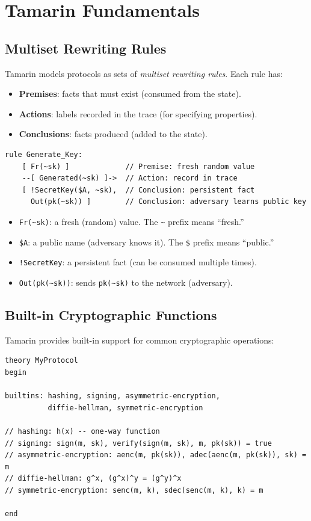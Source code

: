 \section{Tamarin Fundamentals}


\subsection{Multiset Rewriting Rules}

Tamarin models protocols as sets of \emph{multiset rewriting rules}. Each rule has:
\begin{itemize}[nosep]
  \item \textbf{Premises}: facts that must exist (consumed from the state).
  \item \textbf{Actions}: labels recorded in the trace (for specifying properties).
  \item \textbf{Conclusions}: facts produced (added to the state).
\end{itemize}

\begin{lstlisting}[language=Tamarin,caption={A multiset rewriting rule}]
rule Generate_Key:
    [ Fr(~sk) ]             // Premise: fresh random value
    --[ Generated(~sk) ]->  // Action: record in trace
    [ !SecretKey($A, ~sk),  // Conclusion: persistent fact
      Out(pk(~sk)) ]        // Conclusion: adversary learns public key
\end{lstlisting}

\begin{itemize}[nosep]
  \item \texttt{Fr(\~{}sk)}: a fresh (random) value. The \texttt{\~{}} prefix means ``fresh.''
  \item \texttt{\$A}: a public name (adversary knows it). The \texttt{\$} prefix means ``public.''
  \item \texttt{!SecretKey}: a persistent fact (can be consumed multiple times).
  \item \texttt{Out(pk(\~{}sk))}: sends \texttt{pk(\~{}sk)} to the network (adversary).
\end{itemize}

\subsection{Built-in Cryptographic Functions}

Tamarin provides built-in support for common cryptographic operations:

\begin{lstlisting}[language=Tamarin,caption={Tamarin builtins}]
theory MyProtocol
begin

builtins: hashing, signing, asymmetric-encryption,
          diffie-hellman, symmetric-encryption

// hashing: h(x) -- one-way function
// signing: sign(m, sk), verify(sign(m, sk), m, pk(sk)) = true
// asymmetric-encryption: aenc(m, pk(sk)), adec(aenc(m, pk(sk)), sk) = m
// diffie-hellman: g^x, (g^x)^y = (g^y)^x
// symmetric-encryption: senc(m, k), sdec(senc(m, k), k) = m

end
\end{lstlisting}

